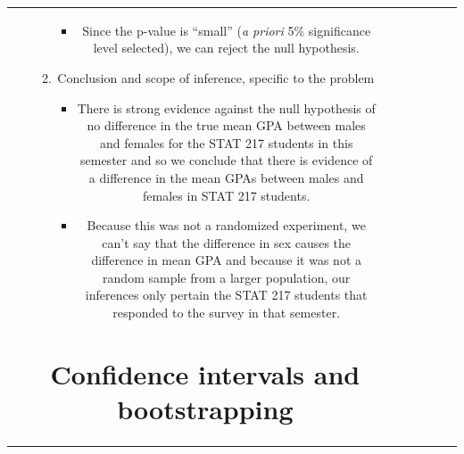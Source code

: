 \documentclass[]{book}
\newenvironment{Shaded}{\begin{snugshade}}{\end{snugshade}}
\providecommand{\tightlist}{%
  \setlength{\itemsep}{0pt}\setlength{\parskip}{0pt}}
\theoremstyle{definition}
\theoremstyle{definition}
\theoremstyle{remark}
\begin{document}
\begin{longtable}[]{@{}ccccccc@{}}
\begin{minipage}[b]{0.10\columnwidth}
\begin{Shaded}
\begin{Highlighting}[]
\begin{Shaded}
\begin{Highlighting}[]
\begin{enumerate}
\begin{enumerate}
  \begin{itemize}
  \tightlist
  \item
    Since the p-value is ``small'' (\emph{a priori} 5\% significance
    level selected), we can reject the null hypothesis.
  \end{itemize}
\item
  Conclusion and scope of inference, specific to the problem

  \begin{itemize}
  \item
    There is strong evidence against the null hypothesis of no
    difference in the true mean GPA between males and females for the
    STAT 217 students in this semester and so we conclude that there is
    evidence of a difference in the mean GPAs between males and females
    in STAT 217 students.
  \item
    Because this was not a randomized experiment, we can't say that the
    difference in sex causes the difference in mean GPA and because it
    was not a random sample from a larger population, our inferences
    only pertain the STAT 217 students that responded to the survey in
    that semester.
  \end{itemize}
\end{enumerate}

\section{Confidence intervals and bootstrapping}\label{section2-8}


\end{enumerate}
\end{Highlighting}
\end{Shaded}
\end{Highlighting}
\end{Shaded}
\end{minipage}
\end{longtable}
\end{document}
